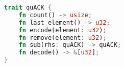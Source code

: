 \begin{lstfloat}[t]
\begin{lstlisting}[language=Rust]
trait quACK {
    fn count() -> usize;
    fn last_element() -> u32;
    fn encode(element: u32);
    fn remove(element: u32);
    fn sub(rhs: quACK) -> quACK;
    fn decode() -> &[u32];
}
\end{lstlisting}
\label{lst:quack:api}
\end{lstfloat}
